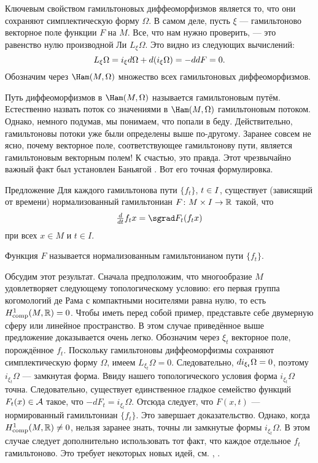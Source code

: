 Ключевым свойством гамильтоновых диффеоморфизмов является то, что они сохраняют симплектическую форму $\Omega$.
В самом деле, пусть $\xi$ --- гамильтоново векторное поле функции $F$ на $M$.
Все, что нам нужно проверить, --- это равенство нулю производной Ли $L_\xi \Omega$.
Это видно из следующих вычислений: 
\[L_\xi \Omega = i_\xi d\Omega + d (i_\xi \Omega) = -dd F = 0.\]
Обозначим через $\Ham (M, \Omega)$ множество всех гамильтоновых диффеоморфизмов.

Путь диффеоморфизмов в $\Ham (M, \Omega)$ называется гамильтоновым путём.
Естественно назвать поток со значениями в $\Ham (M, \Omega)$ гамильтоновым потоком.
Однако, немного подумав, мы понимаем, что попали в беду.
Действительно, гамильтоновы потоки уже были определены выше по-другому.
Заранее совсем не ясно, почему векторное поле, соответствующее гамильтонову пути, является гамильтоновым векторным полем!
К счастью, это правда.
Этот чрезвычайно важный факт был установлен Баньягой \cite{B1}.
Вот его точная формулировка.

\begin{thm}{Предложение}\label{1.4.B}
Для каждого гамильтонова пути $\{f_t\}$, $t \z\in I$, существует (зависящий от времени) нормализованный гамильтониан $F\colon M \times I \to \mathbb{R}$ такой, что 
\[\tfrac \d{\d t} f_t x = \sgrad F_t (f_t x)\]
при всех $x \in M$ и $t \in I$.
\end{thm}

Функция $F$ называется нормализованным гамильтонианом
пути $\{f_t\}$.

Обсудим этот результат.
Сначала предположим, что многообразие $M$ удовлетворяет следующему
топологическому условию: его первая группа когомологий де Рама с компактными носителями равна нулю, то есть $H_{\mathrm{comp}}^1 (M, \mathbb{R}) = 0$.
Чтобы иметь перед собой пример, представьте себе двумерную сферу или линейное пространство.
В этом случае приведённое выше предложение доказывается очень легко.
Обозначим через $\xi_t$ векторное поле, порождённое $f_t$.
Поскольку гамильтоновы диффеоморфизмы сохраняют симплектическую форму $\Omega$, имеем $L_{\xi_t} \Omega = 0$.
Следовательно, $d i_{\xi_t} \Omega = 0$, поэтому $i_{\xi_t} \Omega$ --- замкнутая форма.
Ввиду нашего топологического условия форма $i_{\xi_t} \Omega$ точна.
Следовательно, существует единственное гладкое семейство функций $F_t (x) \in \mathcal{A}$ такое, что $-dF_t = i_{\xi_t} \Omega$.
Отсюда следует, что $F (x, t)$ --- нормированный гамильтониан $\{f_t\}$.
Это завершает доказательство.
Однако, когда $H^1_{\mathrm{comp}} (M, \mathbb{R}) \ne 0$, нельзя  заранее знать, точны ли замкнутые формы $i_{\xi_t} \Omega$.
В этом случае следует дополнительно использовать тот факт, что каждое отдельное $f_t$ гамильтоново.
Это требует некоторых новых идей, см. \cite{B1}, \cite{MS}.

